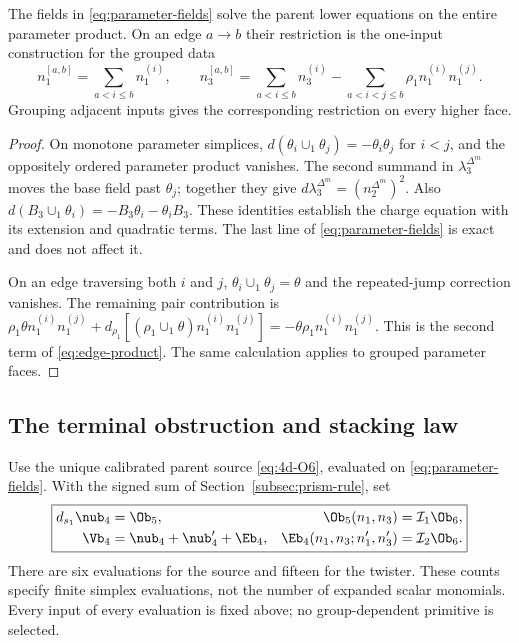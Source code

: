 \begin{lemma}\label{lem:parameter}
The fields in \eqref{eq:parameter-fields} solve the parent lower equations on the entire parameter product. On an edge $a\to b$ their restriction is the one-input construction for the grouped data
\begin{equation}\label{eq:edge-product}
 n_1^{[a,b]}=\sum_{a<i\le b}n_1^{(i)},\qquad
 n_3^{[a,b]}=\sum_{a<i\le b}n_3^{(i)}
       -\sum_{a<i<j\le b}\rho_1n_1^{(i)}n_1^{(j)}.
\end{equation}
Grouping adjacent inputs gives the corresponding restriction on every higher face.
\end{lemma}
\begin{proof}
On monotone parameter simplices,
$d(\theta_i\cup_1\theta_j)=-\theta_i\theta_j$ for $i<j$, and the oppositely ordered parameter product vanishes. The second summand in $\lambda_3^{\Delta^m}$ moves the base field past $\theta_j$; together they give
$d\lambda_3^{\Delta^m}=(n_2^{\Delta^m})^2$.
Also $d(B_3\cup_1\theta_i)=-B_3\theta_i-\theta_i B_3$.
These identities establish the charge equation with its extension and quadratic terms. The last line of \eqref{eq:parameter-fields} is exact and does not affect it.

On an edge traversing both $i$ and $j$, $\theta_i\cup_1\theta_j=\theta$ and the repeated-jump correction vanishes. The remaining pair contribution is
$\rho_1\theta n_1^{(i)}n_1^{(j)}
+d_{\rho_1}[(\rho_1\cup_1\theta)n_1^{(i)}n_1^{(j)}]
=-\theta\rho_1n_1^{(i)}n_1^{(j)}$.
This is the second term of \eqref{eq:edge-product}. The same calculation applies to grouped parameter faces.
\end{proof}

\subsection{The terminal obstruction and stacking law}
Use the unique calibrated parent source \eqref{eq:4d-O6}, evaluated on \eqref{eq:parameter-fields}. With the signed sum of Section~\ref{subsec:prism-rule}, set
\begin{equation}\label{eq:3d-terminal}
 \boxed{\begin{aligned}
 d_{s_1}\nub_4&=\Ob_5,
 &\Ob_5(n_1,n_3)&=\mathcal I_1\Ob_6,\\
 \Vb_4&=\nub_4+\nub'_4+\Eb_4,
 &\Eb_4(n_1,n_3;n'_1,n'_3)&=\mathcal I_2\Ob_6.
 \end{aligned}}
\end{equation}
There are six evaluations for the source and fifteen for the twister. These counts specify finite simplex evaluations, not the number of expanded scalar monomials. Every input of every evaluation is fixed above; no group-dependent primitive is selected.

